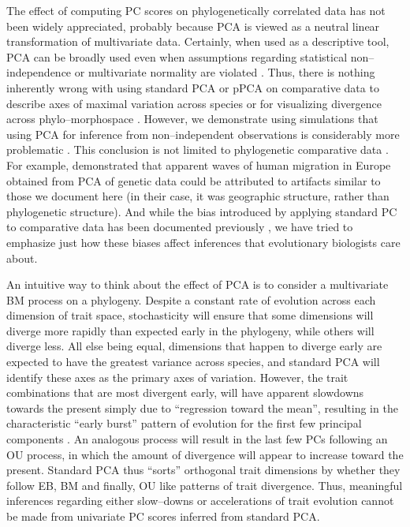 \documentclass[a4paper,11pt]{article}
\begin{document}
The effect of computing PC scores on phylogenetically correlated data has not been widely appreciated, probably because PCA is viewed as a neutral linear transformation of multivariate data. Certainly, when used as a descriptive tool, PCA can be broadly used even when assumptions regarding statistical non--independence or multivariate normality are violated \citep{Jolliffe2002}. Thus, there is nothing inherently wrong with using standard PCA or pPCA on comparative data to describe axes of maximal variation across species or for visualizing divergence across phylo--morphospace \citep{Sidlauskas2008}. However, we demonstrate using simulations that using PCA for inference from non--independent observations is considerably more problematic \citep{Jolliffe2002}. This conclusion is not limited to phylogenetic comparative data \citep[see][]{Richman1986, Podani2002, Novembre, Bookstein2012}. For example, \citet{Novembre} demonstrated that apparent waves of human migration in Europe obtained from PCA of genetic data \citep[e.g.,][]{Cavalli} could be attributed to artifacts similar to those we document here (in their case, it was geographic structure, rather than phylogenetic structure). And while the bias introduced by applying standard PC to comparative data has been documented previously \citep{Revell2008, Polly2013}, we have tried to emphasize just how these biases affect inferences that evolutionary biologists care about.

An intuitive way to think about the effect of PCA is to consider a multivariate BM process on a phylogeny. Despite a constant rate of evolution across each dimension of trait space, stochasticity will ensure that some dimensions will diverge more rapidly than expected early in the phylogeny, while others will diverge less. All else being equal, dimensions that happen to diverge early are expected to have the greatest variance across species, and standard PCA will identify these axes as the primary axes of variation. However, the trait combinations that are most divergent early, will have apparent slowdowns towards the present simply due to ``regression toward the mean'', resulting in the characteristic ``early burst'' pattern of evolution for the first few principal components \citep[for a related point in the context of models of lineage diversification, see][]{Pennell2012}. An analogous process will result in the last few PCs following an OU process, in which the amount of divergence will appear to increase toward the present. Standard PCA thus ``sorts'' orthogonal trait dimensions by whether they follow EB, BM and finally, OU like patterns of trait divergence. Thus, meaningful inferences regarding either slow--downs or accelerations of trait evolution cannot be made from univariate PC scores inferred from standard PCA. 
\end{document}
